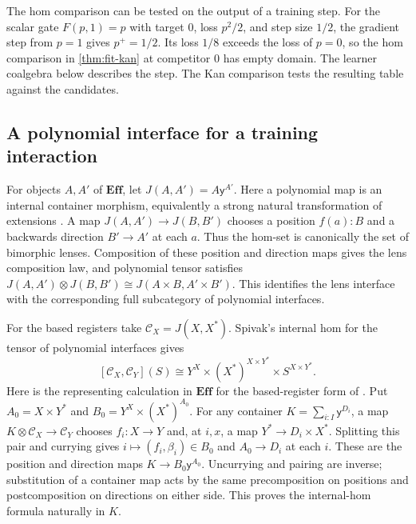 \documentclass[11pt,a4paper]{article}
\theoremstyle{definition}
\theoremstyle{remark}\newaliascnt{remark}{theorem}
\newcommand{\E}{\mathbf{Eff}}
\numberwithin{equation}{section}
\begin{document}
The hom comparison can be tested on the output of a training step. For the scalar gate \(F(p,1)=p\) with target \(0\), loss \(p^2/2\), and step size \(1/2\), the gradient step from \(p=1\) gives \(p^+=1/2\). Its loss \(1/8\) exceeds the loss of \(p=0\), so the hom comparison in \cref{thm:fit-kan} at competitor \(0\) has empty domain. The learner coalgebra below describes the step. The Kan comparison tests the resulting table against the candidates.

\subsection{A polynomial interface for a training interaction}
For objects \(A,A'\) of \(\E\), let \(J(A,A')=A\mathsf y^{A'}\). Here a polynomial map is an internal container morphism, equivalently a strong natural transformation of extensions \cite[Proposition 2.12]{poly:gambino-kock}. A map \(J(A,A')\to J(B,B')\) chooses a position \(f(a):B\) and a backwards direction \(B'\to A'\) at each \(a\). Thus the hom-set is canonically the set of bimorphic lenses. Composition of these position and direction maps gives the lens composition law, and polynomial tensor satisfies \(J(A,A')\otimes J(B,B')\cong J(A\times B,A'\times B')\). This identifies the lens interface with the corresponding full subcategory of polynomial interfaces.

For the based registers take \(\mathcal C_X=J(X,X^*)\). Spivak's internal hom for the tensor of polynomial interfaces \cite{learn:languages} gives
\begin{equation}\label{eq:learn-poly}
 [\mathcal C_X,\mathcal C_Y](S)
 \cong Y^X\times (X^*)^{X\times Y^*}\times S^{X\times Y^*}.
\end{equation}
Here is the representing calculation in $\E$ for the based-register form of \cite[Proposition 2.8]{learn:languages}. Put $A_0=X\times Y^*$ and $B_0=Y^X\times (X^*)^{A_0}$. For any container $K=\sum_{i:I}\mathsf y^{D_i}$, a map $K\otimes\mathcal C_X\to\mathcal C_Y$ chooses $f_i:X\to Y$ and, at $i,x$, a map $Y^*\to D_i\times X^*$. Splitting this pair and currying gives $i\mapsto(f_i,\beta_i)\in B_0$ and $A_0\to D_i$ at each $i$. These are the position and direction maps $K\to B_0\mathsf y^{A_0}$. Uncurrying and pairing are inverse; substitution of a container map acts by the same precomposition on positions and postcomposition on directions on either side. This proves the internal-hom formula naturally in $K$.
\end{document}
